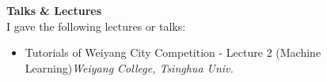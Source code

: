 \documentclass{resume} %
\begin{document}
\textbf{Talks \& Lectures} \\
I gave the following lectures or talks:
\begin{itemize}
    \item Tutorials of Weiyang City Competition  - Lecture 2 (Machine Learning)\hfill \textit{Weiyang College, Tsinghua Univ.}
\end{itemize}





\end{document}
